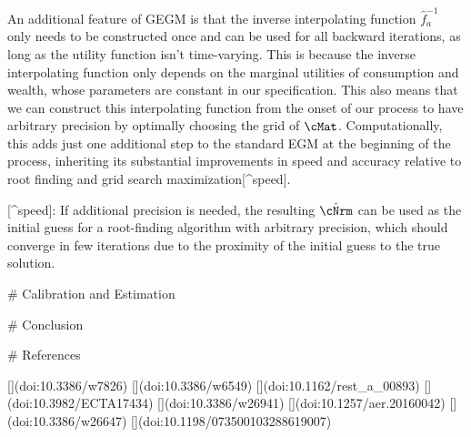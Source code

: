 An additional feature of GEGM is that the inverse interpolating function $\hat{f}_{a}^{-1}$ only needs to be constructed once and can be used for all backward iterations, as long as the utility function isn't time-varying. This is because the inverse interpolating function only depends on the marginal utilities of consumption and wealth, whose parameters are constant in our specification. This also means that we can construct this interpolating function from the onset of our process to have arbitrary precision by optimally choosing the grid of $\cMat$. Computationally, this adds just one additional step to the standard EGM at the beginning of the process, inheriting its substantial improvements in speed and accuracy relative to root finding and grid search maximization[^speed].

[^speed]: If additional precision is needed, the resulting $\hat{\cNrm}$ can be used as the initial guess for a root-finding algorithm with arbitrary precision, which should converge in few iterations due to the proximity of the initial guess to the true solution.

# Calibration and Estimation

# Conclusion

# References

    [](doi:10.3386/w7826)
[](doi:10.3386/w6549)
[](doi:10.1162/rest_a_00893)
[](doi:10.3982/ECTA17434)
[](doi:10.3386/w26941)
[](doi:10.1257/aer.20160042)
[](doi:10.3386/w26647)
[](doi:10.1198/073500103288619007)
